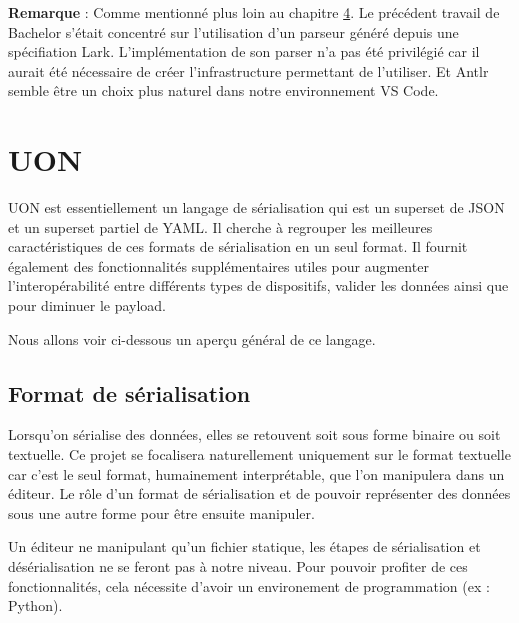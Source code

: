\documentclass[
    iict, %
    il, %
]{heig-tb}
\begin{document}
\textbf{Remarque} :
Comme mentionné plus loin au chapitre \hyperref[grammar scope]{4}. Le précédent travail de Bachelor s'était concentré sur l'utilisation d'un parseur généré depuis une spécifiation Lark.
L'implémentation de son parser n'a pas été privilégié car il aurait été nécessaire de créer l'infrastructure permettant de l'utiliser.
Et Antlr semble être un choix plus naturel dans notre environnement VS Code.

\section{UON}
UON est essentiellement un langage de sérialisation qui est un superset de JSON et un superset partiel de YAML.
Il cherche à regrouper les meilleures caractéristiques de ces formats de sérialisation en un seul format.
Il fournit également des fonctionnalités supplémentaires utiles pour augmenter l'interopérabilité entre différents types de dispositifs, valider les données ainsi que pour diminuer le payload.

Nous allons voir ci-dessous un aperçu général de ce langage.

\subsection{Format de sérialisation}

Lorsqu'on sérialise des données, elles se retouvent soit sous forme binaire ou soit textuelle.
Ce projet se focalisera naturellement uniquement sur le format textuelle car c'est le seul format, humainement interprétable, que l'on manipulera dans un éditeur.
Le rôle d'un format de sérialisation et de pouvoir représenter des données sous une autre forme pour être ensuite manipuler.

Un éditeur ne manipulant qu'un fichier statique, les étapes de sérialisation et désérialisation ne se feront pas à notre niveau.
Pour pouvoir profiter de ces fonctionnalités, cela nécessite d'avoir un environement de programmation (ex : Python).


\end{document}
